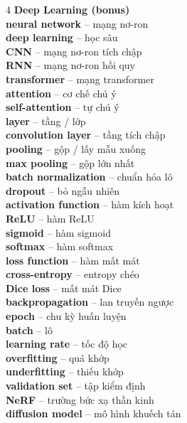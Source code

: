 \begin{multicols}{4}
\textbf{Deep Learning (bonus)}\\
\textbf{neural network} -- mạng nơ-ron\\
\textbf{deep learning} -- học sâu\\
\textbf{CNN} -- mạng nơ-ron tích chập\\
\textbf{RNN} -- mạng nơ-ron hồi quy\\
\textbf{transformer} -- mạng transformer\\
\textbf{attention} -- cơ chế chú ý\\
\textbf{self-attention} -- tự chú ý\\
\textbf{layer} -- tầng / lớp\\
\textbf{convolution layer} -- tầng tích chập\\
\textbf{pooling} -- gộp / lấy mẫu xuống\\
\textbf{max pooling} -- gộp lớn nhất\\
\textbf{batch normalization} -- chuẩn hóa lô\\
\textbf{dropout} -- bỏ ngẫu nhiên\\
\textbf{activation function} -- hàm kích hoạt\\
\textbf{ReLU} -- hàm ReLU\\
\textbf{sigmoid} -- hàm sigmoid\\
\textbf{softmax} -- hàm softmax\\
\textbf{loss function} -- hàm mất mát\\
\textbf{cross-entropy} -- entropy chéo\\
\textbf{Dice loss} -- mất mát Dice\\
\textbf{backpropagation} -- lan truyền ngược\\
\textbf{epoch} -- chu kỳ huấn luyện\\
\textbf{batch} -- lô\\
\textbf{learning rate} -- tốc độ học\\
\textbf{overfitting} -- quá khớp\\
\textbf{underfitting} -- thiếu khớp\\
\textbf{validation set} -- tập kiểm định\\
\textbf{NeRF} -- trường bức xạ thần kinh\\
\textbf{diffusion model} -- mô hình khuếch tán\\

\end{multicols}
